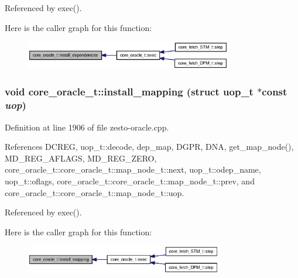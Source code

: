 Referenced by exec().

Here is the caller graph for this function:\nopagebreak
\begin{figure}[H]
\begin{center}
\leavevmode
\includegraphics[width=256pt]{classcore__oracle__t_deeae95a29f95000a81b20fb895a2e64_icgraph}
\end{center}
\end{figure}
\subsubsection[{install\_\-mapping}]{\setlength{\rightskip}{0pt plus 5cm}void core\_\-oracle\_\-t::install\_\-mapping (struct {\bf uop\_\-t} $\ast$const  {\em uop})\hspace{0.3cm}{\tt  [protected]}}\label{classcore__oracle__t_8a47de2d0fbb812311a55d1204cdc1c1}




Definition at line 1906 of file zesto-oracle.cpp.

References DCREG, uop\_\-t::decode, dep\_\-map, DGPR, DNA, get\_\-map\_\-node(), MD\_\-REG\_\-AFLAGS, MD\_\-REG\_\-ZERO, core\_\-oracle\_\-t::core\_\-oracle\_\-t::map\_\-node\_\-t::next, uop\_\-t::odep\_\-name, uop\_\-t::oflags, core\_\-oracle\_\-t::core\_\-oracle\_\-t::map\_\-node\_\-t::prev, and core\_\-oracle\_\-t::core\_\-oracle\_\-t::map\_\-node\_\-t::uop.

Referenced by exec().

Here is the caller graph for this function:\nopagebreak
\begin{figure}[H]
\begin{center}
\leavevmode
\includegraphics[width=244pt]{classcore__oracle__t_8a47de2d0fbb812311a55d1204cdc1c1_icgraph}
\end{center}
\end{figure}
